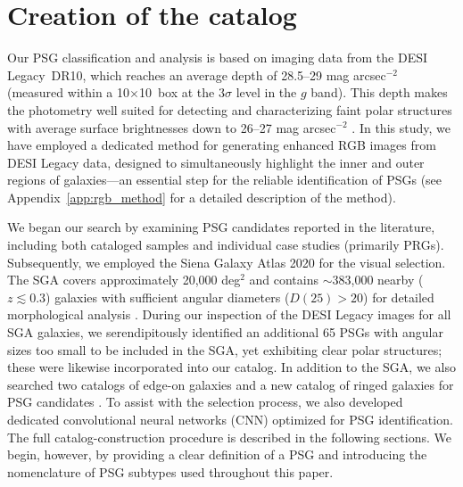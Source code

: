 \documentclass{aa}
\begin{document}
\section{Creation of the catalog}\label{sec:cat_comp}

Our PSG classification and analysis is based on imaging data from the DESI Legacy~DR10, which reaches an average depth of 28.5--29 mag arcsec$^{-2}$ (measured within a 10\textquotesingle\textquotesingle$\times$10\textquotesingle\textquotesingle\ box at the $3\sigma$ level in the $g$ band). This depth makes the photometry well suited for detecting and characterizing faint polar structures with average surface brightnesses down to 26--27 mag arcsec$^{-2}$ \citep{2024MNRAS.532..883S}. In this study, we have employed a dedicated method for generating enhanced RGB images from DESI Legacy data, designed to simultaneously highlight the inner and outer regions of galaxies---an essential step for the reliable identification of PSGs (see Appendix~\ref{app:rgb_method} for a detailed description of the method).

We began our search by examining PSG candidates reported in the literature, including both cataloged samples \citep{1990AJ....100.1489W, 2011MNRAS.418..244M, 2019MNRAS.483.1470R, 2024A&A...681L..15M} and individual case studies (primarily PRGs). Subsequently, we employed the Siena Galaxy Atlas 2020 \citep[SGA hereafter;][]{2023ApJS..269....3M} for the visual selection. The SGA covers approximately 20,000 deg$^2$ and contains $\sim$383,000 nearby ($z\lesssim0.3$) galaxies with sufficient angular diameters ($D(25) > 20$\textquotesingle\textquotesingle) for detailed morphological analysis \citep{2019MNRAS.483.1470R}. During our inspection of the DESI Legacy images for all SGA galaxies, we serendipitously identified an additional 65 PSGs with angular sizes too small to be included in the SGA, yet exhibiting clear polar structures; these were likewise incorporated into our catalog. In addition to the SGA, we also searched two catalogs of edge-on galaxies \citep{2014ApJ...787...24B, 2022MNRAS.511.3063M} and a new catalog of ringed galaxies for PSG candidates \citep{2025ApJS..280...11C}. To assist with the selection process, we also developed dedicated convolutional neural networks (CNN) optimized for PSG identification. The full catalog-construction procedure is described in the following sections. We begin, however, by providing a clear definition of a PSG and introducing the nomenclature of PSG subtypes used throughout this paper.
\end{document}

